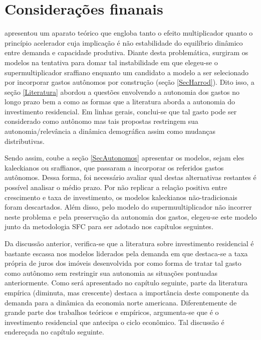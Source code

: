 \section{Considerações finanais}
\label{Concl1}




\textcite{harrod_essay_1939} apresentou um aparato teórico que engloba tanto o efeito multiplicador quanto o princípio acelerador cuja implicação é não estabilidade do equilíbrio dinâmico entre demanda e capacidade produtiva. Diante desta problemática, surgiram os modelos na tentativa para domar tal instabilidade em que elegeu-se o supermultiplicador sraffiano enquanto um candidato a modelo a ser selecionado por incorporar gastos autônomos por construção (seção \ref{SecHarrod}). 
Dito isso, a seção \ref{Literatura} abordou a questões envolvendo a autonomia dos gastos no longo prazo bem a como as formas que a literatura aborda a autonomia do investimento residencial.
Em linhas gerais, conclui-se que tal gasto pode ser considerado como autônomo mas tais propostas restringem sua autonomia/relevância a dinâmica demográfica assim como mudanças distributivas.







Sendo assim, coube a seção \ref{SecAutonomos} apresentar os modelos, sejam eles kaleckianos ou sraffianos, que passaram a incorporar os referidos gastos autônomos.
Dessa forma, foi necessário avaliar qual destas alternativas restantes é possível analisar o médio prazo.
Por não replicar a relação positiva entre crescimento e taxa de investimento, os modelos kaleckianos não-tradicionais foram descartados. 
Além disso, pelo modelo do supermuultiplicador não incorrer neste problema e pela preservação da autonomia dos gastos, elegeu-se este modelo junto da metodologia SFC
para ser adotado nos capítulos seguintes.

Da discussão anterior, verifica-se que a literatura sobre investimento residencial é bastante escassa nos modelos liderados pela demanda em que destaca-se a taxa própria de juros dos imóveis desenvolvida por \textcite{teixeira_crescimento_2015} como forma de tratar tal gasto como autônomo sem restringir sua autonomia as situações pontuadas anteriormente.
Como será apresentado no capítulo seguinte, parte da literatura empírica (diminuta, mas crescente) destaca a importância deste componente da demanda para a dinâmica da economia norte americana. Diferentemente de grande parte dos trabalhos teóricos e empíricos, argumenta-se que é o investimento residencial que antecipa o ciclo econômico. Tal discussão é endereçada no capítulo seguinte.


